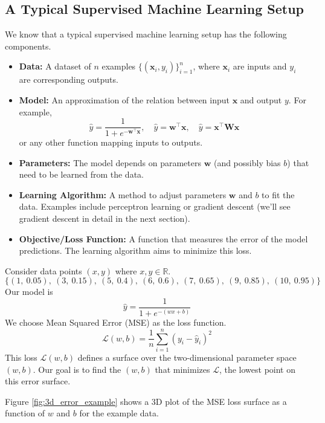 \subsection{A Typical Supervised Machine Learning Setup}

We know that a typical supervised machine learning setup has the following components.

\begin{itemize}
    \item \textbf{Data:} A dataset of $n$ examples $\{(\mathbf{x}_i, y_i)\}_{i=1}^n$, where $\mathbf{x}_i$ are inputs and $y_i$ are corresponding outputs.
    \item \textbf{Model:} An approximation of the relation between input $\mathbf{x}$ and output $y$. For example,
    \[
    \hat{y} = \frac{1}{1 + e^{-\mathbf{w}^\top \mathbf{x}}}, \quad \hat{y} = \mathbf{w}^\top \mathbf{x}, \quad \hat{y} = \mathbf{x}^\top \mathbf{W} \mathbf{x}
    \]
    or any other function mapping inputs to outputs.
    \item \textbf{Parameters:} The model depends on parameters $\mathbf{w}$ (and possibly bias $b$) that need to be learned from the data.
    \item \textbf{Learning Algorithm:} A method to adjust parameters $\mathbf{w}$ and $b$ to fit the data. Examples include perceptron learning or gradient descent (we'll see gradient descent in detail in the next section).
    \item \textbf{Objective/Loss Function:} A function that measures the error of the model predictions. The learning algorithm aims to minimize this loss.
\end{itemize}

Consider data points $(x, y)$ where $x, y \in \mathbb{R}$. 
\[
\{(1,\ 0.05),\ (3,\ 0.15),\ (5,\ 0.4),\ (6,\ 0.6),\ (7,\ 0.65),\ (9,\ 0.85),\ (10,\ 0.95)\}
\]
Our model is 
\[
\hat{y} = \frac{1}{1 + e^{-(w x + b)}}
\]
We choose Mean Squared Error (MSE) as the loss function.
\[
\mathcal{L}(w, b) = \frac{1}{n} \sum_{i=1}^n \left( y_i - \hat{y}_i \right)^2
\]
This loss $\mathcal{L}(w,b)$ defines a surface over the two-dimensional parameter space $(w,b)$. Our goal is to find the $(w,b)$ that minimizes $\mathcal{L}$, the lowest point on this error surface.

Figure \ref{fig:3d_error_example} shows a 3D plot of the MSE loss surface as a function of $w$ and $b$ for the example data. 
 
